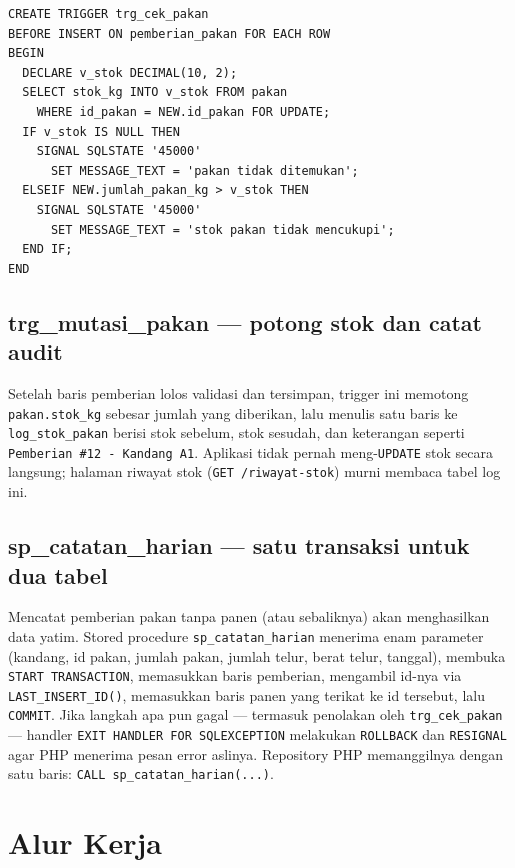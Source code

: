 \documentclass[12pt,a4paper]{article}
\begin{document}
\begin{lstlisting}[caption={Trigger validasi stok (ringkas). File lengkap: backend/db/03\_triggers.sql.}]
CREATE TRIGGER trg_cek_pakan
BEFORE INSERT ON pemberian_pakan FOR EACH ROW
BEGIN
  DECLARE v_stok DECIMAL(10, 2);
  SELECT stok_kg INTO v_stok FROM pakan
    WHERE id_pakan = NEW.id_pakan FOR UPDATE;
  IF v_stok IS NULL THEN
    SIGNAL SQLSTATE '45000'
      SET MESSAGE_TEXT = 'pakan tidak ditemukan';
  ELSEIF NEW.jumlah_pakan_kg > v_stok THEN
    SIGNAL SQLSTATE '45000'
      SET MESSAGE_TEXT = 'stok pakan tidak mencukupi';
  END IF;
END
\end{lstlisting}

\subsection{trg\_mutasi\_pakan --- potong stok dan catat audit}

Setelah baris pemberian lolos validasi dan tersimpan, trigger ini memotong \texttt{pakan.stok\_kg} sebesar jumlah yang diberikan, lalu menulis satu baris ke \texttt{log\_stok\_pakan} berisi stok sebelum, stok sesudah, dan keterangan seperti \texttt{Pemberian \#12 - Kandang A1}. Aplikasi tidak pernah meng-\texttt{UPDATE} stok secara langsung; halaman riwayat stok (\texttt{GET /riwayat-stok}) murni membaca tabel log ini.

\subsection{sp\_catatan\_harian --- satu transaksi untuk dua tabel}

Mencatat pemberian pakan tanpa panen (atau sebaliknya) akan menghasilkan data yatim. Stored procedure \texttt{sp\_catatan\_harian} menerima enam parameter (kandang, id pakan, jumlah pakan, jumlah telur, berat telur, tanggal), membuka \texttt{START TRANSACTION}, memasukkan baris pemberian, mengambil id-nya via \texttt{LAST\_INSERT\_ID()}, memasukkan baris panen yang terikat ke id tersebut, lalu \texttt{COMMIT}. Jika langkah apa pun gagal --- termasuk penolakan oleh \texttt{trg\_cek\_pakan} --- handler \texttt{EXIT HANDLER FOR SQLEXCEPTION} melakukan \texttt{ROLLBACK} dan \texttt{RESIGNAL} agar PHP menerima pesan error aslinya. Repository PHP memanggilnya dengan satu baris: \texttt{CALL sp\_catatan\_harian(...)}.

\section{Alur Kerja}
\end{document}
